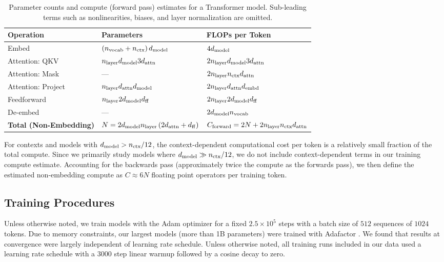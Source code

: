 \documentclass[english]{article}
\begin{document}
\begin{table}[t!]
\centering
\begin{tabular}{|l|l|l|}
\hline 
\textbf{Operation}  & \textbf{Parameters}  & \textbf{FLOPs per Token}\tabularnewline
\hline 
\hline 
Embed  & $\left(n_{{\rm vocab}} + n_{{\rm ctx}}\right)d_{{\rm model}}$  & $4d_{{\rm model}}$\tabularnewline
\hline 
Attention: QKV  & $n_{{\rm layer}}d_{{\rm model}}3d_{{\rm attn}}$  & $2n_{{\rm layer}}d_{{\rm model}}3d_{{\rm attn}}$\tabularnewline
\hline 
Attention: Mask & ---  & $2n_{{\rm layer}}n_{{\rm ctx}}d_{{\rm attn}}$\tabularnewline
\hline 
Attention: Project & $n_{{\rm layer}}d_{{\rm attn}}d_{{\rm model}}$  & $2n_{{\rm layer}}d_{{\rm attn}}d_{{\rm embd}}$\tabularnewline
\hline 
Feedforward  & $n_{{\rm layer}}2d_{{\rm model}}d_{{\rm ff}}$ & $2n_{{\rm layer}}2d_{{\rm model}}d_{{\rm ff}}$\tabularnewline
\hline 
De-embed  & ---  & $2d_{{\rm model}}n_{{\rm vocab}}$\tabularnewline
\hline 
\hline 
\textbf{Total (Non-Embedding)} & $N=2d_{{\rm model}}n_{{\rm layer}}\left(2d_{{\rm attn}}+d_{{\rm ff}}\right)$  & $C_{\mathrm{forward}}=2N+2n_{{\rm layer}}n_{{\rm ctx}}d_{{\rm attn}}$\tabularnewline
\hline 
\end{tabular}
\vspace{1em}
\caption[Parameter and compute counts for Transformer]{Parameter counts and compute (forward pass) estimates for a Transformer model.  Sub-leading terms such as nonlinearities, biases, and layer normalization are omitted. \label{tab:TableTransformerParamsFLOPs}}
\end{table}

For contexts and models with $d_{{\rm model}} > n_{\rm ctx} / 12$, the context-dependent computational cost per token is a relatively small fraction of the total compute.
Since we primarily study models where $d_{\rm model} \gg n_{\rm ctx}/12$, we do not include context-dependent terms in our training compute estimate.  Accounting for the backwards pass (approximately twice the compute as the forwards pass), we then define the estimated non-embedding compute as $C \approx 6 N$ floating point operators per training token.


\subsection{Training Procedures}

Unless otherwise noted, we train  models with the Adam optimizer \cite{kingma2014adam} for a fixed $2.5 \times 10^5$  steps with a batch size of $512$ sequences of $1024$ tokens.
Due to memory constraints, our largest models (more than 1B parameters) were trained with Adafactor \cite{DBLP:journals/corr/abs-1804-04235}.
We found that results at convergence were largely independent of learning rate schedule.  Unless otherwise noted, all training runs included in our data used a learning rate schedule with a 3000 step linear warmup followed by a cosine decay to zero.
\end{document}
